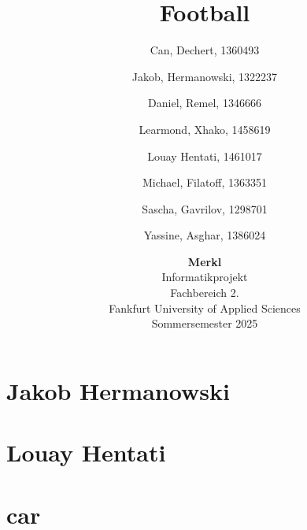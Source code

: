 \documentclass[12pt]{article}
\author{
	Can, Dechert, 1360493\\
	\and
	Jakob, Hermanowski, 1322237\\
	\and
	Daniel, Remel, 1346666\\
	\and
	Learmond, Xhako, 1458619\\
	\and
	Louay Hentati, 1461017\\
	\and
	Michael, Filatoff, 1363351\\
	\and
	Sascha, Gavrilov, 1298701\\
	\and
	Yassine, Asghar, 1386024\\
}
\title{Football}
\date{\vspace{0.5cm}
	\textbf{Merkl}
	\vspace{0.5cm} \\
	Informatikprojekt
	\vspace{0.5cm}\\
	Fachbereich 2.
	\vspace{0.5cm}\\
	Fankfurt University of Applied Sciences
	\vspace{0.5cm} \\
	Sommersemester 2025}
\newcommand{\lowerSectionLevels}{%
  \let\origSection\section
  \let\origSubsection\subsection
  \let\origSubsubsection\subsubsection
  \let\section\origSubsection
  \let\subsection\origSubsubsection
  \let\subsubsection\paragraph
}
\newcommand{\resetSectionLevels}{%
  \let\section\origSection
  \let\subsection\origSubsection
  \let\subsubsection\origSubsubsection
}
\begin{document}
\maketitle
\pagebreak
\tableofcontents

\pagebreak
\section{Jakob Hermanowski}

\pagebreak
\section{Louay Hentati}
\lowerSectionLevels

\resetSectionLevels
\section{car}
\end{document}

